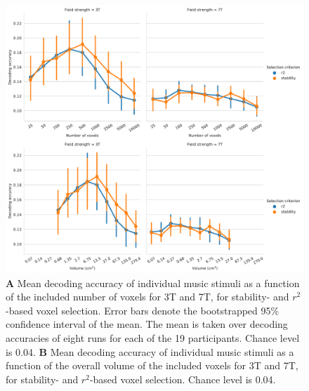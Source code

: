 \begin{figure}[H]
  \centering
    \includegraphics[width=\linewidth]{pics/decoding_selection.pdf}

	\caption{\textbf{A} Mean decoding accuracy of individual music stimuli as a function of
  the included number of voxels for 3T and 7T, for stability- and
  $r^2$-based voxel selection. Error bars denote the bootstrapped 95\%
  confidence interval of the mean. The mean is taken over decoding
  accuracies of eight runs for each of the 19 participants. Chance level is
    0.04. \textbf{B} Mean
decoding accuracy of individual music stimuli as a function of the overall volume of the
included voxels for 3T and 7T, for stability- and $r^2$-based voxel
selection. Chance level is 0.04.
}
 \label{fig:decoding_accuracy_stimulus_selection}
\end{figure}

